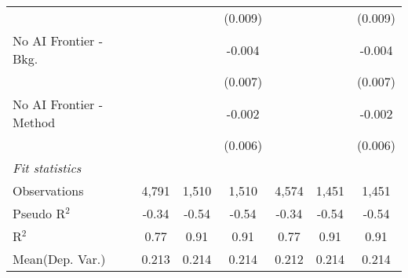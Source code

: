 \begin{tabular}{lcccccc}
                           &             &               & (0.009)       &         &               & (0.009)\\   
   No AI Frontier - Bkg.   &             &               & -0.004        &         &               & -0.004\\   
                           &             &               & (0.007)       &         &               & (0.007)\\   
   No AI Frontier - Method &             &               & -0.002        &         &               & -0.002\\   
                           &             &               & (0.006)       &         &               & (0.006)\\   
   \midrule
   \emph{Fit statistics}\\
   Observations            & 4,791       & 1,510         & 1,510         & 4,574   & 1,451         & 1,451\\  
   Pseudo R$^2$            & -0.34       & -0.54         & -0.54         & -0.34   & -0.54         & -0.54\\  
   R$^2$                   & 0.77        & 0.91          & 0.91          & 0.77    & 0.91          & 0.91\\  
Mean(Dep. Var.) & 0.213 & 0.214 & 0.214 & 0.212 & 0.214 & 0.214 \\
   

\end{tabular}
